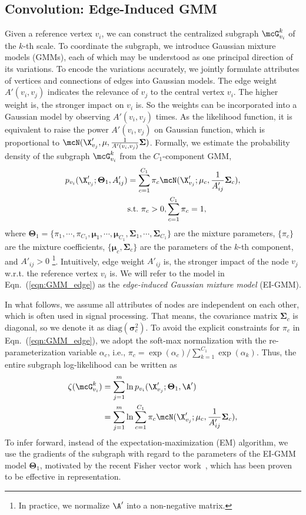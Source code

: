 \documentclass[letterpaper]{article} \usepackage{aaai19}  \usepackage{times}  \usepackage{helvet}  \usepackage{courier}  \usepackage{url}  \usepackage{graphicx}  \frenchspacing  \setlength{\pdfpagewidth}{8.5in}  \setlength{\pdfpageheight}{11in}
\def\ie{{i.e.}} \def\etal{{et.al}}
\def\bSigma{\mathbf{\Sigma}} \def\bmu{\mathbf{\mu}}  \def\btheta{\mathbf{\theta}} \def\bTheta{\mathbf{\Theta}}
\def\bsigma{\mathbf{\sigma}}
\begin{document}
\subsection{Convolution: Edge-Induced GMM}

Given a reference vertex $v_i$, we can construct the centralized subgraph $\mcG_{v_i}^k$ of the $k$-th scale.
To coordinate the subgraph, we introduce Gaussian mixture models (GMMs), each of which may be understood as one principal direction of its variations. To encode the variations accurately, we jointly formulate attributes of vertices and connections of edges into Gaussian models. The edge weight $A'(v_i,v_j)$ indicates the relevance of $v_j$ to the central vertex $v_i$. The higher weight is, the stronger impact on $v_i$ is. So the weights can be incorporated into a Gaussian model by observing $A'(v_i,v_j)$ times. As the likelihood function, it is equivalent to raise the power $A'(v_i,v_j)$ on Gaussian function, which is proportional to $\mcN(\X'_{v_j}, \bmu, \frac{1}{A'(v_i,v_j)}\bSigma)$. Formally,  we estimate the probability density of the subgraph $\mcG_{v_i}^k$ from the $C_1$-component GMM,
\begin{align}
p_{v_i}(\X'_{v_j};\bTheta_1,A'_{ij}) &= \sum_{c=1}^{C_1}\pi_c\mcN(\X'_{v_j}; \bmu_c, \frac{1}{A'_{ij}}\bSigma_c), \nonumber \\
&\st \pi_c>0, \sum_{c=1}^{C_1}\pi_c=1, \label{eqn:GMM_edge}
\end{align}
where $\bTheta_1=\{\pi_1,\cdots,\pi_{C_1}, \bmu_1,\cdots,\bmu_{C_1},\bSigma_1,\cdots,\bSigma_{C_1}\}$ are the mixture parameters, $\{\pi_c\}$ are the mixture coefficients, $\{\bmu_c, \bSigma_c\}$ are the parameters of the $k$-th component, and $A'_{ij}>0$ \footnote{In practice, we normalize $\A'$ into a non-negative matrix.}. Intuitively, edge weight $A'_{ij}$ is, the stronger impact of the node $v_j$ w.r.t. the reference vertex $v_i$ is. We will refer to the model in Eqn.~(\ref{eqn:GMM_edge}) as the \textit{edge-induced Gaussian mixture model} (EI-GMM).

In what follows, we assume all attributes of nodes are independent on each other, which is often used in signal processing. That means, the covariance matrix $\bSigma_c$ is diagonal, so we denote it as $\text{diag}(\bsigma_c^2)$. To avoid the explicit constraints for $\pi_c$ in Eqn.~(\ref{eqn:GMM_edge}), we adopt the soft-max normalization with the re-parameterization variable $\alpha_c$, \ie, $\pi_c = {\exp(\alpha_c)}/{\sum_{k=1}^{C_1}\exp(\alpha_k)}$. Thus, the entire subgraph log-likelihood can be written as
\begin{align}
\zeta(\mcG_{v_i}^k) &= \sum_{j=1}^m\ln p_{v_i}(\X'_{v_j};\bTheta_1,\A') \nonumber \\
&= \sum_{j=1}^m\ln\sum_{c=1}^{C_1}\pi_c\mcN(\X'_{v_j}; \bmu_c, \frac{1}{A'_{ij}}\bSigma_c),\label{eqn:GMM_log}
\end{align}
To infer forward, instead of the expectation-maximization (EM) algorithm, we use the gradients of the subgraph with regard to the parameters of the EI-GMM model $\bTheta_1$, motivated by the recent Fisher vector work~\cite{sanchez2013image}, which has been proven to be effective in representation.
\end{document}
